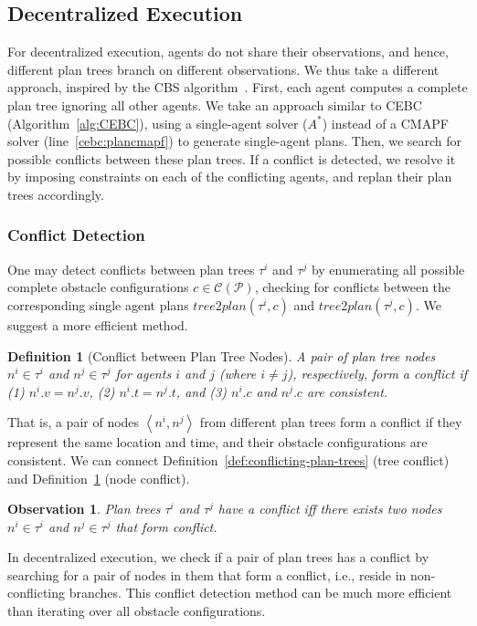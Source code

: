\documentclass[letterpaper]{article} %
\newcommand{\toplan}{\textit{tree2plan}}
\newcommand{\tuple}[1]{\ensuremath{\left \langle #1 \right \rangle }}
\newtheorem{observation}{Observation}
\newtheorem{definition}{Definition}
\begin{document}
\subsection{Decentralized Execution}
\label{scn:decentralized}
For decentralized execution, agents do not share their observations, and hence, different plan trees branch on different observations.
We thus take a different approach, inspired by the CBS algorithm~\cite{sharon2015conflict}.
First, each agent computes a complete plan tree ignoring all other agents. We take an approach similar to CEBC (Algorithm~\ref{alg:CEBC}), using a single-agent solver ($A^*$) instead of a CMAPF solver (line~\ref{cebc:plancmapf}) to generate single-agent plans.
Then, we search for possible conflicts between these plan trees.
If a conflict is detected, we resolve it by imposing
constraints on each of the conflicting agents, and replan their plan trees accordingly.
\subsubsection{Conflict Detection}
\label{scn:conflicts}
One may detect conflicts between plan trees $\tau^i$ and $\tau^j$ by enumerating all possible complete obstacle configurations $c\in\mathcal{C}(\mathcal{P})$, checking for conflicts between the corresponding single agent plans $\toplan(\tau^i,c)$ and $\toplan(\tau^j,c)$.
We suggest a more efficient method.
\begin{definition}[Conflict between Plan Tree Nodes]
A pair of plan tree nodes $n^i\in\tau^i$ and $n^j\in\tau^j$ for agents $i$ and $j$ (where $i\neq j$), respectively, form a conflict if
(1) $n^i.v = n^j.v$,
(2) $n^i.t = n^j.t$,
and (3) $n^i.c$ and $n^j.c$ are consistent.
\label{def:mapfou-conflict}
\end{definition}
That is, a pair of nodes $\tuple{n^i,n^j}$ from different plan trees form a conflict if they represent the same location and time, and their obstacle configurations are consistent.
We can connect Definition~\ref{def:conflicting-plan-trees} (tree conflict) and  Definition~\ref{def:mapfou-conflict} (node conflict).
\begin{observation}
Plan trees $\tau^i$ and $\tau^j$ have a conflict
iff there exists two nodes $n^i\in\tau^i$ and $n^j\in\tau^j$ that form conflict.
\label{obs:conditionsForConflicts}
\end{observation}
In decentralized execution, we check if a pair of plan trees has a conflict by searching for a pair of nodes in them that form a conflict, i.e., reside in non-conflicting branches.
This conflict detection method can be much more efficient than iterating over all obstacle configurations.
\end{document}
